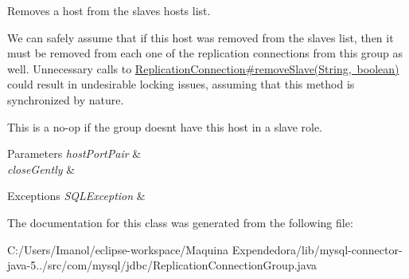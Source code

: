 Removes a host from the slaves hosts list.

We can safely assume that if this host was removed from the slaves list, then it must be removed from each one of the replication connections from this group as well. Unnecessary calls to \mbox{\hyperlink{}{Replication\+Connection\#remove\+Slave(\+String, boolean)}} could result in undesirable locking issues, assuming that this method is synchronized by nature.

This is a no-\/op if the group doesn\textquotesingle{}t have this host in a slave role.


\begin{DoxyParams}{Parameters}
{\em host\+Port\+Pair} & \\
\hline
{\em close\+Gently} & \\
\hline
\end{DoxyParams}

\begin{DoxyExceptions}{Exceptions}
{\em S\+Q\+L\+Exception} & \\
\hline
\end{DoxyExceptions}


The documentation for this class was generated from the following file\+:\begin{DoxyCompactItemize}
\item 
C\+:/\+Users/\+Imanol/eclipse-\/workspace/\+Maquina Expendedora/lib/mysql-\/connector-\/java-\/5../src/com/mysql/jdbc/Replication\+Connection\+Group.\+java\end{DoxyCompactItemize}
